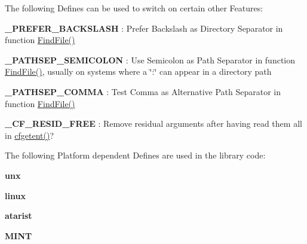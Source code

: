 The following Defines can be used to switch on certain other Features\-:


\begin{DoxyItemize}
\item {\bfseries \-\_\-\-P\-R\-E\-F\-E\-R\-\_\-\-B\-A\-C\-K\-S\-L\-A\-S\-H} \-: Prefer Backslash as Directory Separator in function \hyperlink{group__utilities_ga59fc2b29cf26051e0854b664f5aed15d}{Find\-File()}
\begin{DoxyItemize}
\item {\bfseries \-\_\-\-P\-A\-T\-H\-S\-E\-P\-\_\-\-S\-E\-M\-I\-C\-O\-L\-O\-N} \-: Use Semicolon as Path Separator in function \hyperlink{group__utilities_ga59fc2b29cf26051e0854b664f5aed15d}{Find\-File()}, usually on systems where a \char`\"{}\-:\char`\"{} can appear in a directory path
\item {\bfseries \-\_\-\-P\-A\-T\-H\-S\-E\-P\-\_\-\-C\-O\-M\-M\-A} \-: Test Comma as Alternative Path Separator in function \hyperlink{group__utilities_ga59fc2b29cf26051e0854b664f5aed15d}{Find\-File()}
\item {\bfseries \-\_\-\-C\-F\-\_\-\-R\-E\-S\-I\-D\-\_\-\-F\-R\-E\-E} \-: Remove residual arguments after having read them all in \hyperlink{group__retrieval_gac13ba743ed26e6c05df14817ad9df3da}{cfgetent()}?
\end{DoxyItemize}
\end{DoxyItemize}

The following Platform dependent Defines are used in the library code\-:


\begin{DoxyItemize}
\item {\bfseries unx} 
\begin{DoxyItemize}
\item {\bfseries linux} 
\item {\bfseries atarist} 
\item {\bfseries {\bfseries M\-I\-N\-T}} 
\end{DoxyItemize}
\end{DoxyItemize}